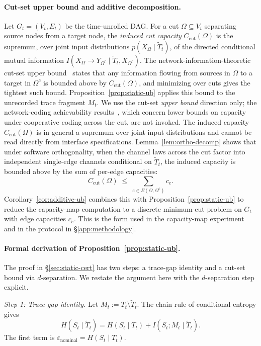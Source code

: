   \paragraph{Cut-set upper bound and additive decomposition.}
  Let $G_t = (V_t, E_t)$ be the time-unrolled DAG. For a cut $\Omega \subseteq
  V_t$ separating source nodes from a target node, the \emph{induced cut
  capacity} $C_\text{cut}(\Omega)$ is the supremum, over joint input
  distributions $p(X_\Omega \mid \tilde T_t)$, of the directed conditional
  mutual information $I(X_\Omega \to Y_{\Omega^c} \mid \tilde T_t,
  X_{\Omega^c})$. The network-information-theoretic cut-set upper
  bound~\citep{elgamal2011network} states that any information flowing from
  sources in $\Omega$ to a target in $\Omega^c$ is bounded above by
  $C_\text{cut}(\Omega)$, and minimizing over cuts gives the tightest such
  bound. Proposition~\ref{prop:static-ub} applies this bound to the unrecorded
  trace fragment $M_t$. We use the cut-set \emph{upper bound} direction only;
  the network-coding achievability results~\citep{ahlswede2000network}, which
  concern lower bounds on capacity under cooperative coding across the cut, are
  not invoked. The induced capacity $C_\text{cut}(\Omega)$ is in general a
  supremum over joint input distributions and cannot be read directly from
  interface specifications. Lemma~\ref{lem:ortho-decomp} shows that under
  software orthogonality, when the channel laws across the cut factor into
  independent single-edge channels conditional on $\tilde T_t$, the induced
  capacity is bounded above by the sum of per-edge capacities:
  \[
    C_\text{cut}(\Omega) \;\leq\; \sum_{e \in E(\Omega, \Omega^c)} c_e.
  \]
  Corollary~\ref{cor:additive-ub} combines this with
  Proposition~\ref{prop:static-ub} to reduce the capacity-map computation to a
  discrete minimum-cut problem on $G_t$ with edge capacities $c_e$. This is the
  form used in the capacity-map experiment and in the protocol in
  \S\ref{app:methodology}.

  \paragraph{Formal derivation of Proposition~\ref{prop:static-ub}.}
  The proof in \S\ref{sec:static-cert} has two steps: a trace-gap identity and a
   cut-set bound via $d$-separation. We restate the argument here with the
  $d$-separation step explicit.

  \emph{Step 1: Trace-gap identity.} Let $M_t := T_t \setminus \tilde T_t$. The
  chain rule of conditional entropy gives 
  \[
    H(S_t \mid \tilde T_t) = H(S_t \mid T_t) + I(S_t; M_t \mid \tilde T_t).
  \]
  The first term is $\varepsilon_\text{nominal} = H(S_t \mid T_t)$.

